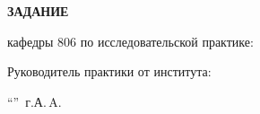 \begin{center}
\bfseries{\large ЗАДАНИЕ}
\end{center}

кафедры 806 по исследовательской практике:

\vspace*{\fill}
Руководитель практики от института:

\vspace{5pt}
\enquote{\hspace{0.5cm}}  \the\year\,г. А.\,A. 
\pagebreak
